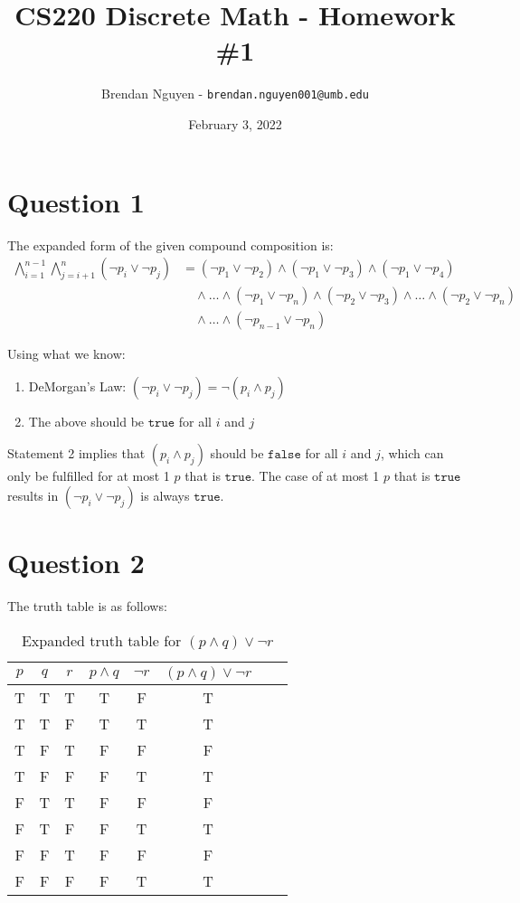 \documentclass[11pt]{article}
\title{CS220 Discrete Math - Homework \#1}
\author{Brendan Nguyen - \texttt{brendan.nguyen001@umb.edu}}
\date{February 3, 2022}
\begin{document}
\maketitle

\section*{Question 1}
The expanded form of the given compound composition is:
\[
    \begin{split}
        \bigwedge_{i=1}^{n-1} \bigwedge_{j=i+1}^n (\neg p_i \vee \neg p_j) &= (\neg p_1 \vee \neg p_2) \wedge (\neg p_1 \vee \neg p_3) \wedge (\neg p_1 \vee \neg p_4)\\
        &\quad\wedge \ldots \wedge (\neg p_1 \vee \neg p_n) \wedge (\neg p_2 \vee \neg p_3) \wedge \ldots \wedge (\neg p_2 \vee \neg p_n)\\
        &\quad\wedge \ldots \wedge (\neg p_{n-1} \vee \neg p_n)
    \end{split}
\]
	
Using what we know:

\begin{enumerate}
  \item DeMorgan's Law: $(\neg p_i \vee \neg p_j) = \neg (p_i \wedge p_j)$
  \item The above should be $\texttt{true}$ for all $i$ and $j$
\end{enumerate}

Statement 2 implies that $(p_i \wedge p_j)$ should be $\texttt{false}$ for all $i$ and $j$, which can only be fulfilled for at most 1 $p$ that is $\texttt{true}$. The case of at most 1 $p$ that is $\texttt{true}$ results in $(\neg p_i \vee \neg p_j)$ is always $\texttt{true}$.

\section*{Question 2}

The truth table is as follows:
\begin{table}[H]
\centering
    \begin{tabular}{|c c c|c|c|c|c|c|}
    \hline
    $p$ & $q$ & $r$ & $p \wedge q$ & $\neg r$ & $(p \wedge q) \vee \neg r$ \\ \hline
    T & T & T & T & F & T\\ \hline
    T & T & F & T & T & T\\ \hline
    T & F & T & F & F & F\\ \hline
    T & F & F & F & T & T\\ \hline
    F & T & T & F & F & F\\ \hline
    F & T & F & F & T & T\\ \hline
    F & F & T & F & F & F\\ \hline
    F & F & F & F & T & T\\ \hline
    \end{tabular}
    \caption{Expanded truth table for $(p \wedge q) \vee \neg r$}
    \label{table:1}
\end{table}
\end{document}
